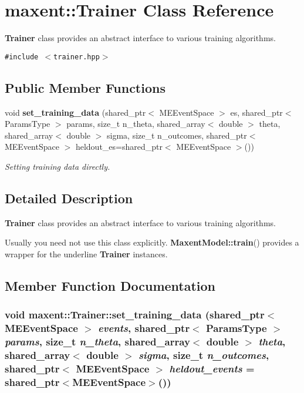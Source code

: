 \section{maxent::Trainer Class Reference}
\label{classmaxent_1_1Trainer}
{\bf Trainer} class provides an abstract interface to various training algorithms.  


{\tt \#include $<$trainer.hpp$>$}

\subsection*{Public Member Functions}
\begin{CompactItemize}
\item 
void {\bf set\_\-training\_\-data} (shared\_\-ptr$<$ MEEvent\-Space $>$ es, shared\_\-ptr$<$ Params\-Type $>$ params, size\_\-t n\_\-theta, shared\_\-array$<$ double $>$ theta, shared\_\-array$<$ double $>$ sigma, size\_\-t n\_\-outcomes, shared\_\-ptr$<$ MEEvent\-Space $>$ heldout\_\-es=shared\_\-ptr$<$ MEEvent\-Space $>$())
\begin{CompactList}\small\item\em Setting training data directly. \item\end{CompactList}\end{CompactItemize}


\subsection{Detailed Description}
{\bf Trainer} class provides an abstract interface to various training algorithms. 

Usually you need not use this class explicitly. {\bf Maxent\-Model::train}() provides a wrapper for the underline {\bf Trainer} instances. 



\subsection{Member Function Documentation}
\subsubsection{\setlength{\rightskip}{0pt plus 5cm}void maxent::Trainer::set\_\-training\_\-data (shared\_\-ptr$<$ MEEvent\-Space $>$ {\em events}, shared\_\-ptr$<$ Params\-Type $>$ {\em params}, size\_\-t {\em n\_\-theta}, shared\_\-array$<$ double $>$ {\em theta}, shared\_\-array$<$ double $>$ {\em sigma}, size\_\-t {\em n\_\-outcomes}, shared\_\-ptr$<$ MEEvent\-Space $>$ {\em heldout\_\-events} = shared\_\-ptr$<$MEEvent\-Space$>$())}\label{classmaxent_1_1Trainer_a3}


